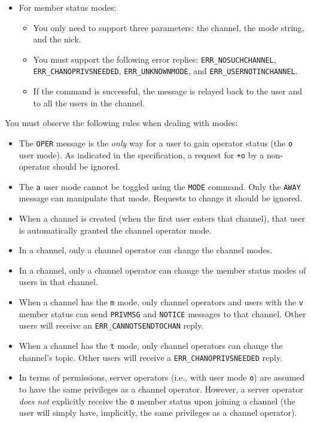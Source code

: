 \documentclass[10pt]{article}
\begin{document}
\begin{itemize}
\item For member status modes:
\begin{itemize}
\item You only need to support three parameters: the channel, the mode string, and the nick.
\item You must support the following error replies: \texttt{ERR\_NOSUCHCHANNEL}, \texttt{ERR\_CHANOPRIVSNEEDED}, \texttt{ERR\_UNKNOWNMODE}, and \texttt{ERR\_USERNOTINCHANNEL}.
\item If the command is successful, the message is relayed back to the user and to all the users in the channel.
\end{itemize}

\end{itemize}

You must observe the following rules when dealing with modes:

\begin{itemize}
\item The \texttt{OPER} message is the \emph{only} way for a user to gain operator status (the \texttt{o} user mode). As indicated in the specification, a request for \texttt{+o} by a non-operator should be ignored.
\item The \texttt{a} user mode cannot be toggled using the \texttt{MODE} command. Only the \texttt{AWAY} message can manipulate that mode.
Requests to change it should be ignored.
\item When a channel is created (when the first user enters that channel), that user is automatically granted the channel operator mode.
\item In a channel, only a channel operator can change the channel modes.
\item In a channel, only a channel operator can change the member status modes of users in that channel.
\item When a channel has the \texttt{m} mode, only channel operators and users with the \texttt{v} member status can send \texttt{PRIVMSG} and \texttt{NOTICE} messages to that channel. Other users will receive an \texttt{ERR\_CANNOTSENDTOCHAN} reply.
\item When a channel has the \texttt{t} mode, only channel operators can change the channel's topic. Other users will receive a \texttt{ERR\_CHANOPRIVSNEEDED} reply.
\item In terms of permissions, server operators (i.e., with user mode \texttt{o}) are assumed to have the same privileges as a channel operator. However, a server operator \emph{does not} explicitly receive the \texttt{o} member status upon joining a channel (the user will simply have, implicitly, the same privileges as a channel operator).
\end{itemize}
\end{document}
